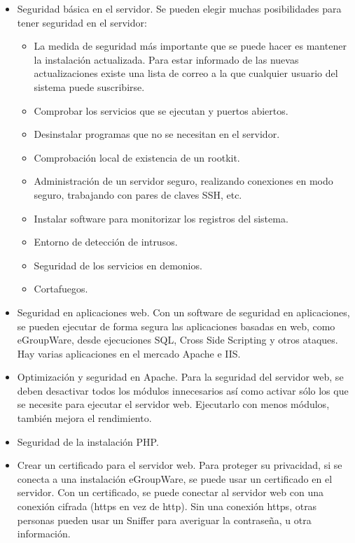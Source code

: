 \begin{itemize}
	\item Seguridad básica en el servidor. Se pueden elegir muchas posibilidades para tener seguridad en el servidor:
	\begin{itemize}
		\item La medida de seguridad más importante que se puede hacer es mantener la instalación actualizada. Para estar informado de las nuevas actualizaciones existe una lista de correo a la que cualquier usuario del sistema puede suscribirse.
		\item Comprobar los servicios que se ejecutan y puertos abiertos.
		\item Desinstalar programas que no se necesitan en el servidor.
		\item Comprobación local de existencia de un rootkit.
		\item Administración de un servidor seguro, realizando conexiones en modo seguro, trabajando con pares de claves SSH, etc.
		\item Instalar software para monitorizar los registros del sistema.
		\item Entorno de detección de intrusos.
		\item Seguridad de los servicios en demonios.
		\item Cortafuegos.
	\end{itemize}
	\item Seguridad en aplicaciones web. Con un software de seguridad en aplicaciones, se pueden ejecutar de forma segura las aplicaciones basadas en web, como eGroupWare, desde ejecuciones SQL, Cross Side Scripting y otros ataques. Hay varias aplicaciones en el mercado Apache e IIS.
	\item Optimización y seguridad en Apache. Para la seguridad del servidor web, se deben desactivar todos los módulos innecesarios así como activar sólo los que se necesite para ejecutar el servidor web. Ejecutarlo con menos módulos, también mejora el rendimiento.
	\item Seguridad de la instalación PHP.
	\item Crear un certificado para el servidor web. Para proteger su privacidad, si se conecta a una instalación eGroupWare, se puede usar un certificado en el servidor. Con un certificado, se puede conectar al servidor web con una conexión cifrada (https en vez de http). Sin una conexión https, otras personas pueden usar un Sniffer para averiguar la contraseña, u otra información.
\end{itemize}

